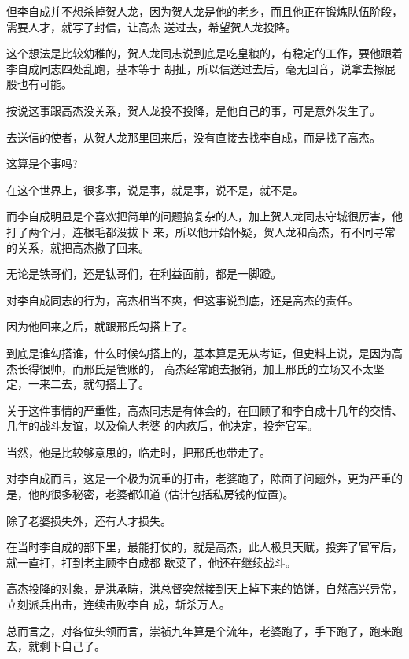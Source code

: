 \documentclass[11pt,a4paper,onecolumn]{article}
\begin{document}
但李自成并不想杀掉贺人龙，因为贺人龙是他的老乡，而且他正在锻炼队伍阶段，需要人才，就写了封信，让高杰
送过去，希望贺人龙投降。

这个想法是比较幼稚的，贺人龙同志说到底是吃皇粮的，有稳定的工作，要他跟着李自成同志四处乱跑，基本等于
胡扯，所以信送过去后，毫无回音，说拿去擦屁股也有可能。

按说这事跟高杰没关系，贺人龙投不投降，是他自己的事，可是意外发生了。

去送信的使者，从贺人龙那里回来后，没有直接去找李自成，而是找了高杰。

这算是个事吗?

在这个世界上，很多事，说是事，就是事，说不是，就不是。

而李自成明显是个喜欢把简单的问题搞复杂的人，加上贺人龙同志守城很厉害，他打了两个月，连根毛都没拔下
来，所以他开始怀疑，贺人龙和高杰，有不同寻常的关系，就把高杰撤了回来。

无论是铁哥们，还是钛哥们，在利益面前，都是一脚蹬。

对李自成同志的行为，高杰相当不爽，但这事说到底，还是高杰的责任。

因为他回来之后，就跟邢氏勾搭上了。

到底是谁勾搭谁，什么时候勾搭上的，基本算是无从考证，但史料上说，是因为高杰长得很帅，而邢氏是管账的，
高杰经常跑去报销，加上邢氏的立场又不太坚定，一来二去，就勾搭上了。

关于这件事情的严重性，高杰同志是有体会的，在回顾了和李自成十几年的交情、几年的战斗友谊，以及偷人老婆
的内疚后，他决定，投奔官军。

当然，他是比较够意思的，临走时，把邢氏也带走了。

对李自成而言，这是一个极为沉重的打击，老婆跑了，除面子问题外，更为严重的是，他的很多秘密，老婆都知道
(估计包括私房钱的位置)。

除了老婆损失外，还有人才损失。

在当时李自成的部下里，最能打仗的，就是高杰，此人极具天赋，投奔了官军后，就一直打，打到老主顾李自成都
歇菜了，他还在继续战斗。

高杰投降的对象，是洪承畴，洪总督突然接到天上掉下来的馅饼，自然高兴异常，立刻派兵出击，连续击败李自
成，斩杀万人。

总而言之，对各位头领而言，崇祯九年算是个流年，老婆跑了，手下跑了，跑来跑去，就剩下自己了。

\section[\thesection]{}
\end{document}
